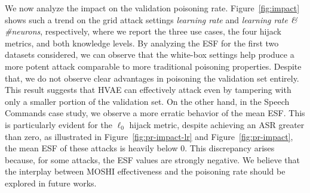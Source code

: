 We now analyze the impact on the validation poisoning rate. 
Figure~\ref{fig:impact} shows such a trend on the grid attack settings \textit{learning rate} and \textit{learning rate \& \#neurons}, respectively, where we report the three use cases, the four hijack metrics, and both knowledge levels.
By analyzing the ESF for the first two datasets considered, we can observe that the white-box settings help produce a more potent attack comparable to more traditional poisoning properties.
Despite that, we do not observe clear advantages in poisoning the validation set entirely. This result suggests that HVAE can effectively attack even by tampering with only a smaller portion of the validation set.
On the other hand, in the Speech Commands case study, we observe a more erratic behavior of the mean ESF.
This is particularly evident for the $\ell_0$ hijack metric, despite achieving an ASR greater than zero, as illustrated in Figure~\ref{fig:pr-impact-lr} and Figure~\ref{fig:pr-impact}, the mean ESF of these attacks is heavily below 0.
This discrepancy arises because, for some attacks, the ESF values are strongly negative.
We believe that the interplay between MOSHI effectiveness and the poisoning rate should be explored in future works. 

 

